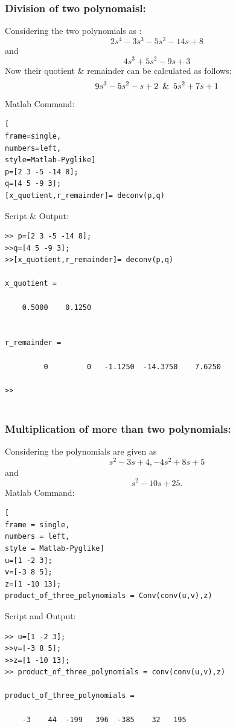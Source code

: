 \documentclass[conference]{IEEEtran}
\begin{document}

\subsubsection{Division of two polynomaisl:}
Considering the two polynomials  as :
$$2s^4 - 3s^3 - 5s^2- 14s + 8$$ and
$$4s^3 + 5s^2 - 9s+ 3$$
Now their quotient \& remainder can be calculated as follows:
$$9s^3 - 5s^2 -s + 2 \hspace{0.5em}\& \hspace{0.5em} 5s^2 + 7s + 1$$
Matlab Command:
\begin{lstlisting}[
frame=single,
numbers=left,
style=Matlab-Pyglike]
p=[2 3 -5 -14 8];
q=[4 5 -9 3];
[x_quotient,r_remainder]= deconv(p,q)
\end{lstlisting}
Script \& Output:
\begin{verbatim}
>> p=[2 3 -5 -14 8];
>>q=[4 5 -9 3];
>>[x_quotient,r_remainder]= deconv(p,q)

x_quotient =

    0.5000    0.1250


r_remainder =

         0         0   -1.1250  -14.3750    7.6250

>>  
    
\end{verbatim}



\subsubsection{Multiplication of more than two 
polynomials:}
Considering the polynomials are given as
$$s^2 -3s + 4, -4s^2 + 8s + 5$$ 
and
$$s^2 -10s +25.$$
Matlab Command:
\begin{lstlisting}[
frame = single,
numbers = left,
style = Matlab-Pyglike]
u=[1 -2 3];
v=[-3 8 5];
z=[1 -10 13];
product_of_three_polynomials = Conv(conv(u,v),z)
\end{lstlisting}
Script and Output:
\begin{verbatim}
>> u=[1 -2 3];
>>v=[-3 8 5];
>>z=[1 -10 13];
>> product_of_three_polynomials = conv(conv(u,v),z)

product_of_three_polynomials =

    -3    44  -199   396  -385    32   195
\end{verbatim}




\end{document}

